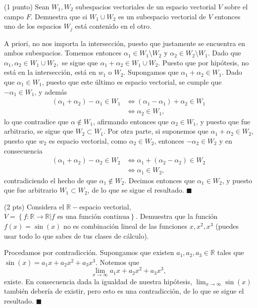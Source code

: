 \documentclass[11pt]{scrartcl}
\begin{document}
\newpage
\begin{mdframed}[style=mdpurplebox, frametitle={Ejercicio 4, Tarea 05, Álgebra Lineal I}]
    (1 punto) Sean $W_1,W_2$ subespacios vectoriales de un espacio vectorial $V$ sobre el campo $F$. Demuestra que si $W_1\cup W_2$ es un subespacio vectorial de $V$
    entonces uno de los espacios $W_j$ está contenido en el otro.
\end{mdframed}

\begin{Sol}
    A priori, no nos importa la intersección, puesto que justamente se encuentra en ambos subespacios. Tomemos entonces $\alpha_1 \in W_1\setminus W_2$ y $\alpha_2 \in W_2\setminus W_1$. Dado que $\alpha_1,\alpha_2 \in W_1\cup W_2,$
    se sigue que $\alpha_1+\alpha_2\in W_1\cup W_2$. Puesto que por hipótesis, no está en la intersección, está en $w_1$ o $W_2$. Supongamos que $\alpha_1+\alpha_2 \in W_1$. Dado que $\alpha_1 \in W_1$, puesto que este último es espacio vectorial, se cumple que $-\alpha_1 \in W_1$,
    y además
\begin{align*}
    (\alpha_1+\alpha_2)-\alpha_1 \in W_1 &\iff (\alpha_1-\alpha_1)+\alpha_2 \in W_1 \\
     &\iff \alpha_2 \in W_1,
\end{align*}
    lo que contradice que $\alpha \notin W_1$, afirmando entonces que $\alpha_2 \in W_1$, y puesto que fue arbitrario, se sigue que $W_2\subset W_1$.
    Por otra parte, si suponemos que $\alpha_1+\alpha_2 \in W_2$, puesto que $w_2$ es espacio vectorial, como $\alpha_2 \in W_2$, entonces $-\alpha_2 \in W_2$ y en consecuencia
\begin{align*}
    (\alpha_1+\alpha_2)-\alpha_2 \in W_2 &\iff \alpha_1+(\alpha_2-\alpha_2) \in W_2 \\
     &\iff \alpha_1 \in W_2,    
\end{align*}
    contradiciendo el hecho de que $\alpha_1 \notin W_2$. Decimos entonces que $\alpha_1 \in W_2$, y puesto que fue arbitrario $W_1 \subset W_2$, de lo que se sigue el resultado. $\blacksquare$
\end{Sol}

\begin{mdframed}[style=mdpurplebox, frametitle={Ejercicio 5, Tarea 05, Álgebra Lineal I}]
    (2 pts) Considera el $\mathbb{R}-$espacio vectorial, $V=\left\{f:\mathbb{R}\rightarrow\mathbb{R}|f \text{ es una función continua}\right\}$. Demuestra que la
    función $f(x)=\sin(x)$ no es combinación lineal de las funciones $x,x^2,x^3$ (puedes usar todo lo que sabes de tus clases de cálculo).
\end{mdframed}

\begin{Sol}
    Procedamos por contradicción. Supongamos que existen $a_1,a_2,a_3 \in \mathbb{R}$ tales que
    $\sin(x)=a_1x+a_2x^2+a_3x^3$. Notemos que
    \[
    \lim_{x\rightarrow \infty}a_1x+a_2x^2+a_3x^3,
    \]
    existe. En consecuencia dada la igualdad de nuestra hipótesis, $\lim_{x\rightarrow\infty}\sin(x)$ también debería de existir, pero esto es una contradicción, de lo que se sigue el resultado. $\blacksquare$
\end{Sol}
\end{document}
